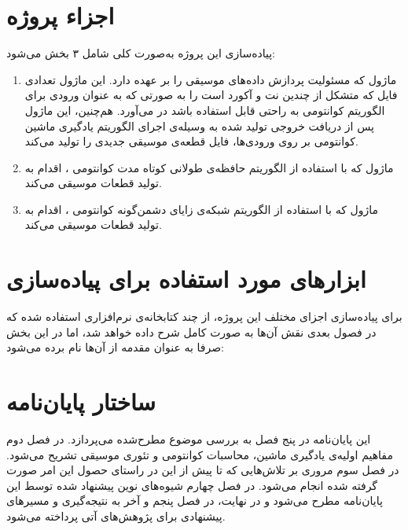 \newpage
\section{اجزاء پروژه} \label{sec:parts}
پیاده‌سازی این پروژه به‌صورت کلی شامل ۳ بخش می‌شود:
\begin{enumerate}
    \item ماژول
    که مسئولیت پردازش داده‌های موسیقی را بر عهده دارد. این ماژول تعدادی فایل که متشکل از چندین نت و آکورد است را به صورتی که به عنوان ورودی برای الگوریتم کوانتومی به راحتی قابل استفاده باشد در می‌آورد. هم‌چنین، این ماژول پس از دریافت خروجی تولید شده به وسیله‌ی اجرای الگوریتم یادگیری ماشین کوانتومی بر روی ورودی‌ها، فایل قطعه‌ی موسیقی جدیدی را تولید می‌کند.
    \item ماژول
    که با استفاده از الگوریتم حافظه‌ی طولانی کوتاه مدت کوانتومی
    \cite{chen_qlstm}،
    اقدام به تولید قطعات موسیقی می‌کند.
    
    \item ماژول
    که با استفاده از الگوریتم شبکه‌ی زایای دشمن‌گونه کوانتومی
    \cite{lloyd_qugan} \cite{zoufal_qugan}،
    اقدام به تولید قطعات موسیقی می‌کند.

\end{enumerate}

\section{ابزارهای مورد استفاده برای پیاده‌سازی}

برای پیاده‌سازی اجزای مختلف این پروژه، از چند کتابخانه‌ی نرم‌افزاری استفاده شده که در فصول بعدی نقش آن‌ها به صورت کامل شرح داده خواهد شد، اما در این بخش صرفا به عنوان مقدمه از آن‌ها نام برده می‌شود:

\vspace{-1.7cm}
\section{ساختار پایان‌نامه}
این پایان‌نامه در پنج فصل به بررسی موضوع مطرح‌شده می‌پردازد. در فصل دوم مفاهیم اولیه‌ی یادگیری ماشین، محاسبات کوانتومی و تئوری موسیقی تشریح می‌شود. در فصل سوم مروری بر تلاش‌هایی که تا پیش از این در راستای حصول این امر صورت گرفته شده انجام می‌شود.
در فصل چهارم شیوه‌های نوین پیشنهاد شده توسط این پایان‌نامه مطرح می‌شود و در نهایت، در فصل پنجم و آخر به نتیجه‌گیری و مسیرهای پیشنهادی برای پژوهش‌های آتی پرداخته می‌شود.